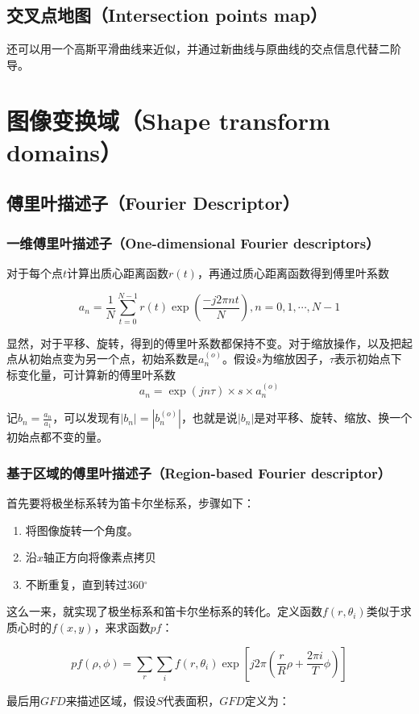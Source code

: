 \documentclass{ctexart}
\begin{document}
\subsection{交叉点地图（Intersection points map）}
还可以用一个高斯平滑曲线来近似，并通过新曲线与原曲线的交点信息代替二阶导。
\section{图像变换域（Shape transform domains）}
\subsection{傅里叶描述子（Fourier Descriptor）}
\subsubsection{一维傅里叶描述子（One-dimensional Fourier descriptors）}
对于每个点$t$计算出质心距离函数$r(t)$，再通过质心距离函数得到傅里叶系数

\[a_n=\frac{1}{N}\sum_{t=0}^{N-1}r(t)\exp(\frac{-j2\pi nt}{N}),n=0,1,\cdots,N-1\]

显然，对于平移、旋转，得到的傅里叶系数都保持不变。对于缩放操作，以及把起点从初始点变为另一个点，初始系数是$a_n^{(o)}$。假设$s$为缩放因子，$\tau$表示初始点下标变化量，可计算新的傅里叶系数
\[a_n=\exp(jn\tau) \times s \times a_n^{(o)}\]

记$b_n=\frac{a_n}{a_1}$，可以发现有$|b_n|=|b_n^{(o)}|$，也就是说$|b_n|$是对平移、旋转、缩放、换一个初始点都不变的量。
\subsubsection{基于区域的傅里叶描述子（Region-based Fourier descriptor）}
首先要将极坐标系转为笛卡尔坐标系，步骤如下：

\begin{enumerate}
\item 将图像旋转一个角度。
\item 沿$x$轴正方向将像素点拷贝
\item 不断重复，直到转过360$^\circ$
\end{enumerate}

这么一来，就实现了极坐标系和笛卡尔坐标系的转化。定义函数$f(r, \theta_i)$类似于求质心时的$f(x,y)$，来求函数$pf$：

\[pf(\rho,\phi)=\sum_r\sum_if(r,\theta_i)\exp[j2\pi(\frac{r}{R}\rho+\frac{2\pi i}{T}\phi)]\]

最后用$GFD$来描述区域，假设$S$代表面积，$GFD$定义为：
\end{document}
